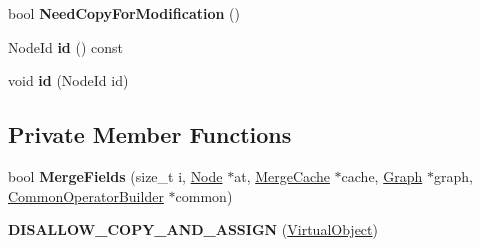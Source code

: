 \begin{DoxyCompactItemize}
\item 
bool {\bfseries Need\+Copy\+For\+Modification} ()\hypertarget{classv8_1_1internal_1_1compiler_1_1_virtual_object_aa0010d46e124b6f9877c91d0fff32853}{}\label{classv8_1_1internal_1_1compiler_1_1_virtual_object_aa0010d46e124b6f9877c91d0fff32853}

\item 
Node\+Id {\bfseries id} () const \hypertarget{classv8_1_1internal_1_1compiler_1_1_virtual_object_add72fbeffe5bc228dadec570127a3d8b}{}\label{classv8_1_1internal_1_1compiler_1_1_virtual_object_add72fbeffe5bc228dadec570127a3d8b}

\item 
void {\bfseries id} (Node\+Id id)\hypertarget{classv8_1_1internal_1_1compiler_1_1_virtual_object_af4344a3b0fe53459b8eafec5b82681bf}{}\label{classv8_1_1internal_1_1compiler_1_1_virtual_object_af4344a3b0fe53459b8eafec5b82681bf}

\end{DoxyCompactItemize}
\subsection*{Private Member Functions}
\begin{DoxyCompactItemize}
\item 
bool {\bfseries Merge\+Fields} (size\+\_\+t i, \hyperlink{classv8_1_1internal_1_1compiler_1_1_node}{Node} $\ast$at, \hyperlink{classv8_1_1internal_1_1compiler_1_1_merge_cache}{Merge\+Cache} $\ast$cache, \hyperlink{classv8_1_1internal_1_1compiler_1_1_graph}{Graph} $\ast$graph, \hyperlink{classv8_1_1internal_1_1compiler_1_1_common_operator_builder}{Common\+Operator\+Builder} $\ast$common)\hypertarget{classv8_1_1internal_1_1compiler_1_1_virtual_object_a950e5e5ed6b5b62b2ded02f4d779c7a6}{}\label{classv8_1_1internal_1_1compiler_1_1_virtual_object_a950e5e5ed6b5b62b2ded02f4d779c7a6}

\item 
{\bfseries D\+I\+S\+A\+L\+L\+O\+W\+\_\+\+C\+O\+P\+Y\+\_\+\+A\+N\+D\+\_\+\+A\+S\+S\+I\+GN} (\hyperlink{classv8_1_1internal_1_1compiler_1_1_virtual_object}{Virtual\+Object})\hypertarget{classv8_1_1internal_1_1compiler_1_1_virtual_object_a5535e3dfe396b8a951c704f51eec0083}{}\label{classv8_1_1internal_1_1compiler_1_1_virtual_object_a5535e3dfe396b8a951c704f51eec0083}

\end{DoxyCompactItemize}
